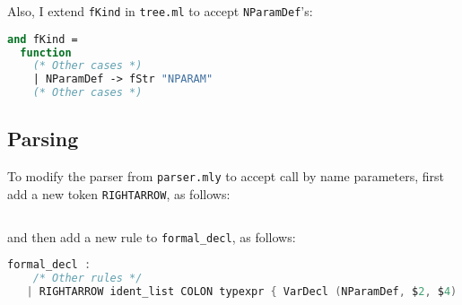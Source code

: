 \documentclass[a4paper,10pt]{article}
\begin{document}
Also, I extend \texttt{fKind} in \texttt{tree.ml} to accept \texttt{NParamDef}'s:

\begin{lstlisting}[language=ml]
and fKind =
  function
    (* Other cases *)
    | NParamDef -> fStr "NPARAM"
    (* Other cases *)
\end{lstlisting}

\subsection{Parsing}

To modify the parser from \texttt{parser.mly} to accept call by name parameters, first add a new token \texttt{RIGHTARROW}, as follows:

\begin{lstlisting}[language=c]
%token                  RIGHTARROW
\end{lstlisting}

and then add a new rule to \texttt{formal\_decl}, as follows:

\begin{lstlisting}[language=c]
formal_decl :   
    /* Other rules */
   | RIGHTARROW ident_list COLON typexpr { VarDecl (NParamDef, $2, $4) } ;
\end{lstlisting}
\end{document}
